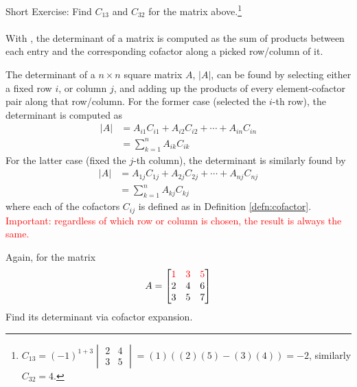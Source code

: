 Short Exercise: Find $C_{13}$ and $C_{32}$ for the matrix above.\footnote{$C_{13} = (-1)^{1+3}\begin{vmatrix}
2 & 4 \\
3 & 5
\end{vmatrix} = (1)((2)(5)-(3)(4)) = -2$, similarly $C_{32} = 4$.}\\
\\
With , the determinant of a matrix is computed as the sum of products between each entry and the corresponding cofactor along a picked row/column of it.
\begin{proper}
\label{proper:cofactorex}
The determinant of a $n \times n$ square matrix $A$, $|A|$, can be found by selecting either a fixed row $i$, or column $j$, and adding up the products of every element-cofactor pair along that row/column. For the former case (selected the $i$-th row), the determinant is computed as
\begin{align*}
|A| &= A_{i1}C_{i1} + A_{i2}C_{i2} + \cdots + A_{in}C_{in} \\
&= \sum_{k=1}^{n} A_{ik}C_{ik}
\end{align*}
For the latter case (fixed the $j$-th column), the determinant is similarly found by
\begin{align*}
|A| &= A_{1j}C_{1j} + A_{2j}C_{2j} + \cdots + A_{nj}C_{nj} \\
&= \sum_{k=1}^{n} A_{kj}C_{kj}
\end{align*}
where each of the cofactors $C_{ij}$ is defined as in Definition \ref{defn:cofactor}. \textcolor{red}{Important: regardless of which row or column is chosen, the result is always the same.}
\end{proper}
\begin{exmp}
Again, for the matrix
\begin{align*}
A =
\begin{bmatrix}
\textcolor{red}{1} & \textcolor{red}{3} & \textcolor{red}{5} \\
2 & 4 & 6 \\
3 & 5 & 7 
\end{bmatrix}   
\end{align*}
Find its determinant via cofactor expansion.
\end{exmp}
